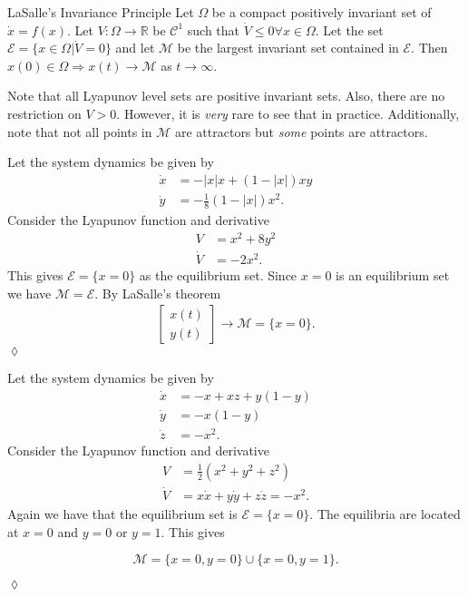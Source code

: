 \begin{theorem}{LaSalle's Invariance Principle}
Let $\Omega$ be a compact positively invariant set of $\dot{x}=f(x)$.
Let $V:\Omega\to\mathbb{R}$ be $\mathcal{C}^1$ such that $\dot{V}\leq0 \forall x \in \Omega$.
Let the set $\mathcal{E}=\{x\in\Omega | \dot{V}=0\}$ and let $\mathcal{M}$ be the largest invariant set contained in $\mathcal{E}$.
Then $x(0)\in\Omega \Rightarrow x(t)\to\mathcal{M}$ as $t\to\infty$.
\end{theorem}
Note that all Lyapunov level sets are positive invariant sets.
Also, there are no restriction on $V>0$.
However, it is \textit{very} rare to see that in practice.
Additionally, note that not all points in $\mathcal{M}$ are attractors but \textit{some} points are attractors.

\begin{example}
Let the system dynamics be given by
\begin{align*}
\dot{x} &= -|x|x + (1-|x|)xy \\
\dot{y} &= -\tfrac{1}{8}(1-|x|)x^2.
\end{align*}
Consider the Lyapunov function and derivative
\begin{align*}
V &= x^2 + 8y^2 \\
\dot{V} &= -2x^2.
\end{align*}
This gives $\mathcal{E}=\{x=0\}$ as the equilibrium set.
Since $x=0$ is an equilibrium set we have $\mathcal{M}=\mathcal{E}$.
By LaSalle's theorem
\begin{align*}
\left[\begin{array}{c} x(t) \\ y(t) \end{array}\right] \to\mathcal{M} = \{x=0\}.
\end{align*}
$\lozenge$
\end{example}

\begin{example}
Let the system dynamics be given by
\begin{align*}
\dot{x} &= -x+xz+y(1-y) \\
\dot{y} &= -x(1-y) \\
\dot{z} &= -x^2.
\end{align*}
Consider the Lyapunov function and derivative
\begin{align*}
V &= \tfrac{1}{2}(x^2+y^2+z^2) \\
\dot{V} &= x\dot{x} + y\dot{y} + z\dot{z} = -x^2.
\end{align*}
Again we have that the equilibrium set is $\mathcal{E}=\{x=0\}$.
The equilibria are located at $x=0$ and $y=0$ or $y=1$.
This gives

\begin{equation*}
\mathcal{M} = \{x=0,y=0\} \cup \{x=0,y=1\}.
\end{equation*}

$\lozenge$
\end{example}

